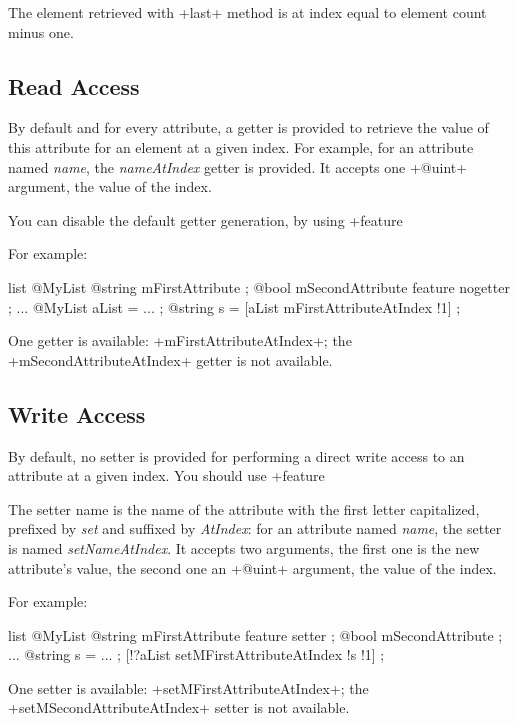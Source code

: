 The element retrieved with \ggs+last+ method is at index equal to element count minus one.

\subsection{Read Access}

By default and for every attribute, a getter is provided to retrieve the value of this attribute for an element at a given index. For example, for an attribute named \emph{name}, the \emph{nameAtIndex} getter is provided. It accepts one \ggs+@uint+ argument, the value of the index.

You can disable the default getter generation, by using \ggs+feature %

For example:
\begin{galgas}
list @MyList {
  @string mFirstAttribute ;
  @bool mSecondAttribute feature nogetter ;
}
...
@MyList aList = ... ;
@string s = [aList mFirstAttributeAtIndex !1] ;
\end{galgas}

One getter is available: \ggs+mFirstAttributeAtIndex+; the \ggs+mSecondAttributeAtIndex+ getter is not available.


\subsection{Write Access}

By default, no setter is provided for performing a direct write access to an attribute at a given index. You should use \ggs+feature %

The setter name is the name of the attribute with the first letter capitalized, prefixed by \emph{set} and suffixed by \emph{AtIndex}: for an attribute named \emph{name}, the setter is named \emph{setNameAtIndex}. It accepts two arguments, the first one is the new attribute's value, the second one an \ggs+@uint+ argument, the value of the index.

For example:

\begin{galgas}
list @MyList {
  @string mFirstAttribute feature setter ;
  @bool mSecondAttribute ;
}
...
@string s = ... ;
[!?aList setMFirstAttributeAtIndex !s !1] ;
\end{galgas}

One setter is available: \ggs+setMFirstAttributeAtIndex+; the \ggs+setMSecondAttributeAtIndex+ setter is not available.

